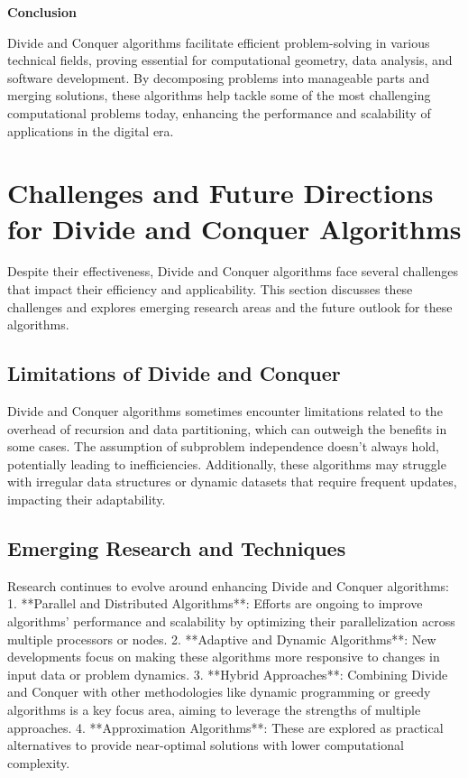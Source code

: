 \documentclass[12pt]{book} %
\begin{document}
\textbf{Conclusion}

Divide and Conquer algorithms facilitate efficient problem-solving in various technical fields, proving essential for computational geometry, data analysis, and software development. By decomposing problems into manageable parts and merging solutions, these algorithms help tackle some of the most challenging computational problems today, enhancing the performance and scalability of applications in the digital era.


\section{Challenges and Future Directions for Divide and Conquer Algorithms}

Despite their effectiveness, Divide and Conquer algorithms face several challenges that impact their efficiency and applicability. This section discusses these challenges and explores emerging research areas and the future outlook for these algorithms.

\subsection{Limitations of Divide and Conquer}

Divide and Conquer algorithms sometimes encounter limitations related to the overhead of recursion and data partitioning, which can outweigh the benefits in some cases. The assumption of subproblem independence doesn't always hold, potentially leading to inefficiencies. Additionally, these algorithms may struggle with irregular data structures or dynamic datasets that require frequent updates, impacting their adaptability.

\subsection{Emerging Research and Techniques}

Research continues to evolve around enhancing Divide and Conquer algorithms:
1. **Parallel and Distributed Algorithms**: Efforts are ongoing to improve algorithms' performance and scalability by optimizing their parallelization across multiple processors or nodes.
2. **Adaptive and Dynamic Algorithms**: New developments focus on making these algorithms more responsive to changes in input data or problem dynamics.
3. **Hybrid Approaches**: Combining Divide and Conquer with other methodologies like dynamic programming or greedy algorithms is a key focus area, aiming to leverage the strengths of multiple approaches.
4. **Approximation Algorithms**: These are explored as practical alternatives to provide near-optimal solutions with lower computational complexity.
\end{document}
